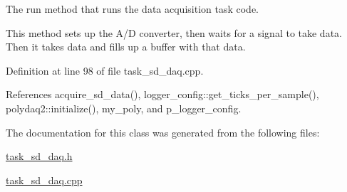The run method that runs the data acquisition task code. 

This method sets up the A/\-D converter, then waits for a signal to take data. Then it takes data and fills up a buffer with that data. 

Definition at line 98 of file task\-\_\-sd\-\_\-daq.\-cpp.



References acquire\-\_\-sd\-\_\-data(), logger\-\_\-config\-::get\-\_\-ticks\-\_\-per\-\_\-sample(), polydaq2\-::initialize(), my\-\_\-poly, and p\-\_\-logger\-\_\-config.



The documentation for this class was generated from the following files\-:\begin{DoxyCompactItemize}
\item 
\hyperlink{task__sd__daq_8h}{task\-\_\-sd\-\_\-daq.\-h}\item 
\hyperlink{task__sd__daq_8cpp}{task\-\_\-sd\-\_\-daq.\-cpp}\end{DoxyCompactItemize}
